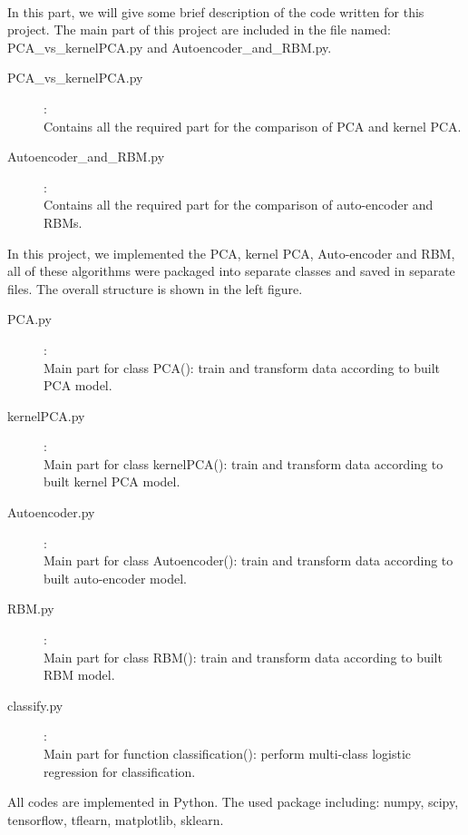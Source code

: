 \documentclass[tikz, multi,dvipsnames,svgnames,x11names]{article}
\begin{document}
\\

In this part, we will give some brief description of the code written for this project. The main part of this project are included in the file named: PCA\_vs\_kernelPCA.py and Autoencoder\_and\_RBM.py.

\begin{description}
\item[PCA\_vs\_kernelPCA.py]:\\
	Contains all the required part for the comparison of PCA and kernel PCA.
\item[Autoencoder\_and\_RBM.py]:\\
	Contains all the required part for the comparison of auto-encoder and RBMs.
\end{description}

In this project, we implemented the PCA, kernel PCA, Auto-encoder and RBM, all of these algorithms were packaged into separate classes and saved in separate files. The overall structure is shown in the left figure.

\begin{description}
\item[PCA.py]:\\
	Main part for class PCA(): train and transform data according to built PCA model.
\item[kernelPCA.py]:\\
	Main part for class kernelPCA(): train and transform data according to built kernel PCA model.
\item[Autoencoder.py]:\\
	Main part for class Autoencoder(): train and transform data according to built auto-encoder model.
\item[RBM.py]:\\
	Main part for class RBM(): train and transform data according to built RBM model.
\item[classify.py]:\\
	Main part for function classification(): perform multi-class logistic regression for classification.
\end{description}

All codes are implemented in Python. The used package including: numpy, scipy, tensorflow, tflearn, matplotlib, sklearn.
\end{document}
